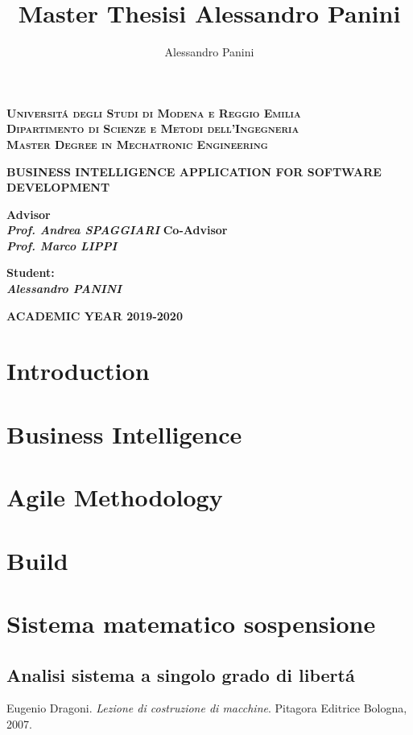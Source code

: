 \documentclass[a4paper,12pt,twoside]{report}
\title{\textbf{Master Thesisi Alessandro Panini}}
\date{}
\author{Alessandro Panini}
\newlength{\drop}%
\newcommand*{\titleSal}%
{
	\begin{center}  
		\begingroup
		{\Large\bfseries\rmfamily\scshape Universit\'a degli Studi di Modena e Reggio Emilia}\\
		{\Large\bfseries\rmfamily\scshape Dipartimento di Scienze e Metodi dell'Ingegneria }\\[\baselineskip]
		\vspace*{1cm}
		\vspace*{\drop}
		{\Large\bfseries\rmfamily\scshape Master Degree in Mechatronic Engineering}\\[\baselineskip]
		\vspace*{\drop}
		
		\vspace*{3cm}
		
		\linespread{3}
		{\LARGE\bfseries\rmfamily BUSINESS INTELLIGENCE APPLICATION FOR SOFTWARE DEVELOPMENT}\\
		\vspace*{4cm}
		
	\end{center}
	\vspace*{2cm}   
	\begin{minipage}{0.5\textwidth}
		\begin{flushleft}
			{\small\bfseries Advisor}\\
			{\bfseries\itshape Prof. Andrea SPAGGIARI }
			{\small\bfseries Co-Advisor}\\
			{\bfseries\itshape Prof. Marco LIPPI }
		\end{flushleft}
	\end{minipage}
	\begin{minipage}{0.4\textwidth}
		\begin{flushright} 
		    \vspace{\baselineskip}
		    \vspace{\baselineskip}
			{\bfseries\small Student:}\\
			{\bfseries\itshape Alessandro PANINI}
		\end{flushright}
	\end{minipage}  
	\vfill
	
	{\large\bfseries\rmfamily ACADEMIC YEAR 2019-2020}
	
	\endgroup
}
\begin{document}
	
\titleSal
\pagestyle{plain}

\newcommand*\rot{\multicolumn{1}{R{45}{1em}}}

	
	\newpage
	
	
	\tableofcontents
	
\chapter*{Introduction}


\chapter{Business Intelligence}
	

\chapter{Agile Methodology}
	

\chapter{Build}
	
		
\cleardoublepage
\chapter{Sistema matematico sospensione}
\section{Analisi sistema a singolo grado di libert\'a}

\begin{thebibliography}{9}
	
	Eugenio Dragoni. 
	\textit{Lezione di costruzione di macchine}.
	Pitagora Editrice Bologna, 2007.
	
\end{thebibliography}
\end{document}
